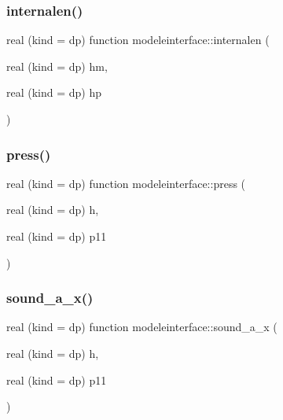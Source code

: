 \mbox{\label{namespacemodeleinterface_a6b953eda7a6bc3e81e6ae451b273b548}} 
\subsubsection{\texorpdfstring{internalen()}{internalen()}\hspace{0.1cm}{\footnotesize\ttfamily [2/2]}}
{\footnotesize\ttfamily real (kind = dp) function modeleinterface\+::internalen (\begin{DoxyParamCaption}\item[{real (kind = dp)}]{hm,  }\item[{real (kind = dp)}]{hp }\end{DoxyParamCaption})}

\mbox{\label{namespacemodeleinterface_ad34088de8c0162343994153e8f34921e}} 
\subsubsection{\texorpdfstring{press()}{press()}}
{\footnotesize\ttfamily real (kind = dp) function modeleinterface\+::press (\begin{DoxyParamCaption}\item[{real (kind = dp)}]{h,  }\item[{real (kind = dp)}]{p11 }\end{DoxyParamCaption})}

\mbox{\label{namespacemodeleinterface_a1505c575aa44b45a8509fe827f28bc8d}} 
\subsubsection{\texorpdfstring{sound\+\_\+a\+\_\+x()}{sound\_a\_x()}}
{\footnotesize\ttfamily real (kind = dp) function modeleinterface\+::sound\+\_\+a\+\_\+x (\begin{DoxyParamCaption}\item[{real (kind = dp)}]{h,  }\item[{real (kind = dp)}]{p11 }\end{DoxyParamCaption})}

